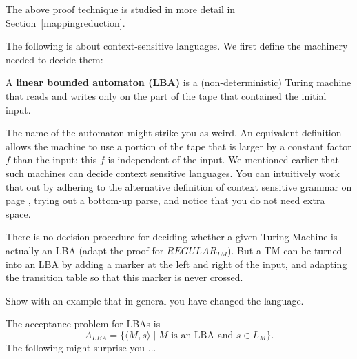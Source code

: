 The above proof technique is studied in more detail in
Section~\ref{mappingreduction}.

The following is about context-sensitive languages. We first define
the machinery needed to decide them:

\begin{definition}
A \textbf{linear bounded automaton (LBA)} is a (non-deterministic) Turing machine
that reads and writes only on the part of the tape that contained the
initial input.
\end{definition}

The name of the automaton might strike you as weird. An equivalent
definition allows the machine to use a portion of the tape that is
larger by a constant factor $f$ than the input: this $f$ is
independent of the input. We mentioned earlier that such machines can
decide context sensitive languages. You can intuitively work that out
by adhering to the alternative definition of context sensitive grammar
on page \pageref{altdefcs}, trying out a bottom-up parse, and notice
that you do not need extra space.

There is no decision procedure for deciding whether a given Turing
Machine is actually an LBA (adapt the proof for $REGULAR_{TM}$). But a
TM can be turned into an LBA by adding a marker at the left and right
of the input, and adapting the transition table so that this marker is
never crossed.
\begin{exercise}
Show with an example that in general you have changed the language.
\end{exercise}

The acceptance problem for LBAs is
\begin{equation*}
	A_{LBA} = \{\langle M,s \rangle \mid \text{$M$ is an LBA and $s\in L_M$} \}.
\end{equation*}
The following might surprise you ...

